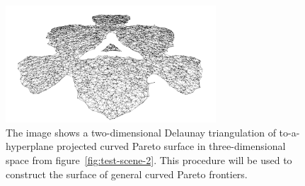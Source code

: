 \documentclass{stdlocal}
\begin{document}
    \begin{figure}
      \center
      \includegraphics[width=0.7\textwidth]{../../images/3d_pareto_front_projected_tessellation.png}
      \caption[]{%
        The image shows a two-dimensional Delaunay triangulation of to-a-hyperplane projected curved Pareto surface in three-dimensional space from figure~\ref{fig:test-scene-2}.
        This procedure will be used to construct the surface of general curved Pareto frontiers.
      }
      \label{fig:delaunay-3d-projected}
    \end{figure}
\end{document}
